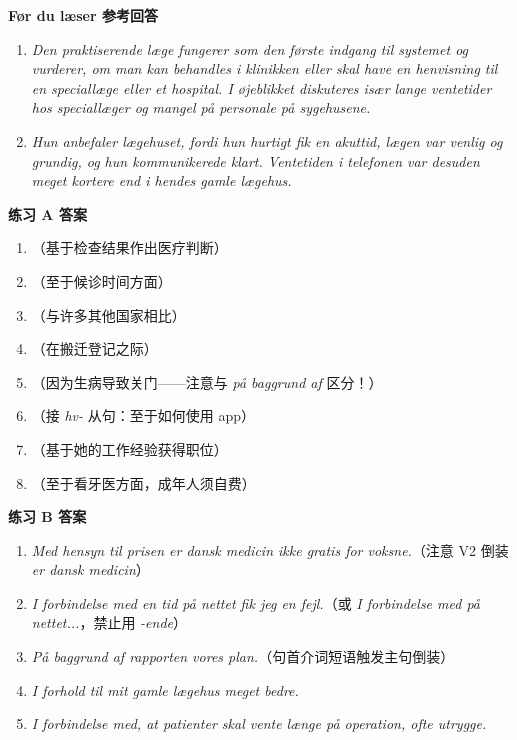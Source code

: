 \begin{answerbox}
\textbf{Før du læser 参考回答}
\begin{enumerate}
  \item \textit{Den praktiserende læge fungerer som den første indgang til systemet og vurderer, om man kan behandles i klinikken eller skal have en henvisning til en speciallæge eller et hospital. I øjeblikket diskuteres især lange ventetider hos speciallæger og mangel på personale på sygehusene.}
  \item \textit{Hun anbefaler lægehuset, fordi hun hurtigt fik en akuttid, lægen var venlig og grundig, og hun kommunikerede klart. Ventetiden i telefonen var desuden meget kortere end i hendes gamle lægehus.}
\end{enumerate}

\textbf{练习 A 答案}
\begin{enumerate}
  \item {}（基于检查结果作出医疗判断）
  \item {}（至于候诊时间方面）
  \item {}（与许多其他国家相比）
  \item {}（在搬迁登记之际）
  \item {}（因为生病导致关门——注意与 \textit{på baggrund af} 区分！）
  \item {}（接 \textit{hv-} 从句：至于如何使用 app）
  \item {}（基于她的工作经验获得职位）
  \item {}（至于看牙医方面，成年人须自费）
\end{enumerate}

\textbf{练习 B 答案}
\begin{enumerate}
  \item \textit{Med hensyn til prisen er dansk medicin ikke gratis for voksne.}（注意 V2 倒装 \textit{er dansk medicin}）
  \item \textit{I forbindelse med  en tid på nettet fik jeg en fejl.}（或 \textit{I forbindelse med  på nettet...}，禁止用 \textit{-ende}）
  \item \textit{På baggrund af rapporten  vores plan.}（句首介词短语触发主句倒装）
  \item \textit{I forhold til mit gamle lægehus  meget bedre.}
  \item \textit{I forbindelse med, at patienter skal vente længe på operation,  ofte utrygge.}
\end{enumerate}


\end{answerbox}
